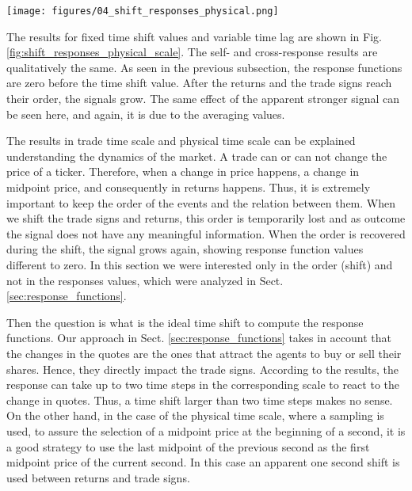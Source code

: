 \begin{figure*}[htbp]
    \centering
    \texttt{[image: figures/04\_shift\_responses\_physical.png]}
    \caption{Self- and cross-response functions $R^{p}_{ij}\left(\tau\right)$
             excluding $\varepsilon^{p}_{j}\left(t\right) = 0$ in 2008 versus
             time lag $\tau$ on a logarithmic scale for different shifts in
             physical time scale. Self-responses functions (left) of individual
             stocks and cross-response functions (right) of stocks pairs from
             the same economic sector.}
    \label{fig:shift_responses_physical_scale}
\end{figure*}

The results for fixed time shift values and variable time lag are shown in Fig.
\ref{fig:shift_responses_physical_scale}. The self- and cross-response results
are qualitatively the same. As seen in the previous subsection, the response
functions are zero before the time shift value. After the returns and the trade
signs reach their order, the signals grow. The same effect of the apparent
stronger signal can be seen here, and again, it is due to the averaging values.

The results in trade time scale and physical time scale can be explained
understanding the dynamics of the market. A trade can or can not change the
price of a ticker. Therefore, when a change in price happens, a change in
midpoint price, and consequently in returns happens. Thus, it is extremely
important to keep the order of the events and the relation between them. When
we shift the trade signs and returns, this order is temporarily lost and as
outcome the signal does not have any meaningful information. When the order is
recovered during the shift, the signal grows again, showing response function
values different to zero. In this section we were interested only in the order
(shift) and not in the responses values, which were analyzed in Sect.
\ref{sec:response_functions}.

Then the question is what is the ideal time shift to compute the response
functions. Our approach in Sect. \ref{sec:response_functions} takes in account
that the changes in the quotes are the ones that attract the agents to buy or
sell their shares. Hence, they directly impact the trade signs. According to
the results, the response can take up to two time steps in the corresponding
scale to react to the change in quotes. Thus, a time shift larger than two time
steps makes no sense.
On the other hand, in the case of the physical time scale, where a sampling is
used, to assure the selection of a midpoint price at the beginning of a second,
it is a good strategy to use the last midpoint of the previous second as the
first midpoint price of the current second. In this case an apparent one second
shift is used between returns and trade signs.